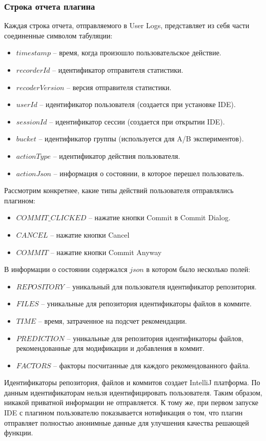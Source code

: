 \subsubsection{Строка отчета плагина}\label{report-line}
Каждая строка отчета, отправляемого в User Logs, представляет из себя части соединенные символом табуляции:
    \begin{itemize}
        \item $timestamp$ -- время, когда произошло пользовательское действие.
        \item $recorderId$ -- идентификатор отправителя статистики.
        \item $recoderVersion$ -- версия отправителя статистики.
        \item $userId$ -- идентификатор пользователя (создается при установке IDE).
        \item $sessionId$ -- идентификатор сессии (создается при открытии IDE).
        \item $bucket$ -- идентификатор группы (используется для A/B экспериментов).
        \item $actionType$ -- идентификатор действия пользователя.
        \item $actionJson$ -- информация о состоянии, в которое перешел пользователь.
    \end{itemize}

Рассмотрим конкретнее, какие типы действий пользователя отправлялись плагином:
    \begin{itemize}
        \item $COMMIT\_CLICKED$ -- нажатие кнопки Commit в Commit Dialog.
        \item $CANCEL$ -- нажатие кнопки Cancel
        \item $COMMIT$ -- нажатие кнопки Commit Anyway
    \end{itemize}

В информации о состоянии содержался $json$ в котором было несколько полей:
    \begin{itemize}
        \item $REPOSITORY$ -- уникальный для пользователя идентификатор репозитория.
        \item $FILES$ -- уникальные для репозитория идентификаторы файлов в коммите.
        \item $TIME$ -- время, затраченное на подсчет рекомендации.
        \item $PREDICTION$ -- уникальные для репозитория идентификаторы файлов, рекомендованные для модификации и добавления в коммит.
        \item $FACTORS$ -- факторы посчитанные для каждого рекомендованного файла.
    \end{itemize}
Идентификаторы репозитория, файлов и коммитов создает IntelliJ платформа. По данным идентификаторам нельзя идентифицировать пользователя. Таким образом, никакой приватной информации не отправляется. К тому же, при первом запуске IDE с плагином пользователю показывается нотификация о том, что плагин отправляет полностью анонимные данные для улучшения качества решающей функции.
